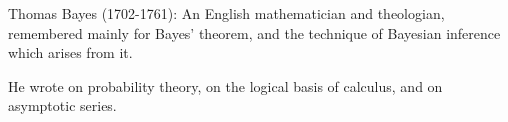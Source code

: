 Thomas Bayes (1702-1761): An English mathematician and theologian,
remembered mainly for Bayes' theorem, and the technique of Bayesian 
inference which arises from it.
\par
He wrote on probability theory, on the logical basis of calculus,
and on asymptotic series.